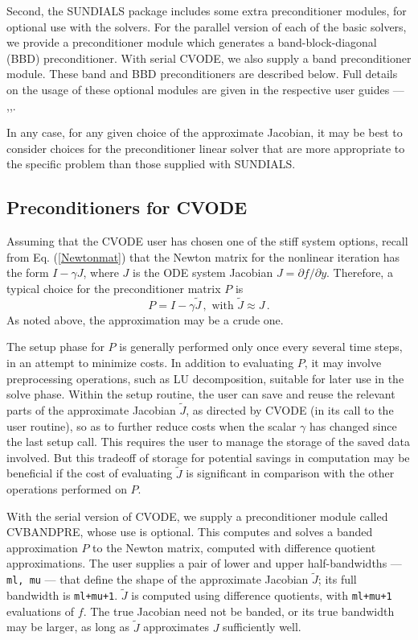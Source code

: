 Second, the SUNDIALS package includes some extra preconditioner
modules, for optional use with the solvers.  For the parallel version
of each of the basic solvers, we provide a preconditioner module which
generates a band-block-diagonal (BBD) preconditioner.  With serial
CVODE, we also supply a band preconditioner module.  These band and
BBD preconditioners are described below.  Full details on the usage
of these optional modules are given in the respective user guides
--- \cite{ByHi:98},\cite{TaHi:98},\cite{HiTa:99}.

In any case, for any given choice of the approximate Jacobian, it may
be best to consider choices for the preconditioner linear solver that
are more appropriate to the specific problem than those supplied with
SUNDIALS.

\subsection{Preconditioners for CVODE}

Assuming that the CVODE user has chosen one of the stiff system
options, recall from Eq. (\ref{Newtonmat}) that the Newton matrix for
the nonlinear iteration has the form $I - \gamma J$, where $J$ is the
ODE system Jacobian $J = \partial f / \partial y$.  Therefore, a
typical choice for the preconditioner matrix $P$ is
\begin{equation*}
  P = I - \gamma \tilde{J} \, , \mbox{ with } \tilde{J} \approx J \, . 
\end{equation*}
As noted above, the approximation may be a crude one.  

The setup phase for $P$ is generally performed only once every several
time steps, in an attempt to minimize costs.  In addition to
evaluating $P$, it may involve preprocessing operations, such as LU
decomposition, suitable for later use in the solve phase.  Within the
setup routine, the user can save and reuse the relevant parts of the
approximate Jacobian $\tilde{J}$, as directed by CVODE (in its call to
the user routine), so as to further reduce costs when the scalar
$\gamma$ has changed since the last setup call.  This requires the
user to manage the storage of the saved data involved.  But this
tradeoff of storage for potential savings in computation may be
beneficial if the cost of evaluating $\tilde{J}$ is significant in
comparison with the other operations performed on $P$.

With the serial version of CVODE, we supply a preconditioner module
called CVBANDPRE, whose use is optional.  This computes and solves a
banded approximation $P$ to the Newton matrix, computed with
difference quotient approximations.  The user supplies a pair of lower
and upper half-bandwidths --- {\tt ml, mu} --- that define the shape of
the approximate Jacobian $\tilde{J}$; its full bandwidth is
{\tt ml+mu+1}.  $\tilde{J}$ is computed using difference quotients,
with {\tt ml+mu+1} evaluations of $f$.  The true Jacobian need not be
banded, or its true bandwidth may be larger, as long as $\tilde{J}$
approximates $J$ sufficiently well.

